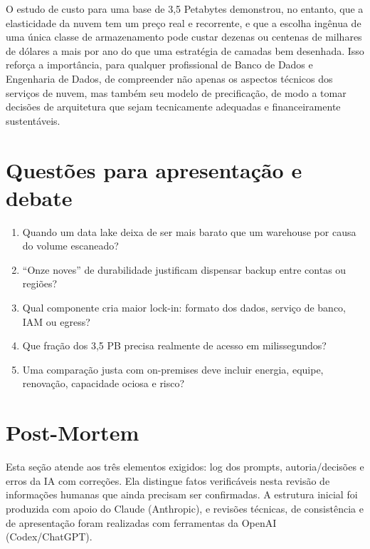 \documentclass[11pt,a4paper]{article}
\begin{document}
O estudo de custo para uma base de 3,5 Petabytes demonstrou, no entanto, que a elasticidade da nuvem tem um preço real e recorrente, e que a escolha ingênua de uma única classe de armazenamento pode custar dezenas ou centenas de milhares de dólares a mais por ano do que uma estratégia de camadas bem desenhada. Isso reforça a importância, para qualquer profissional de Banco de Dados e Engenharia de Dados, de compreender não apenas os aspectos técnicos dos serviços de nuvem, mas também seu modelo de precificação, de modo a tomar decisões de arquitetura que sejam tecnicamente adequadas e financeiramente sustentáveis.

\section{Questões para apresentação e debate}
\begin{enumerate}
\item Quando um data lake deixa de ser mais barato que um warehouse por causa do volume escaneado?
\item ``Onze noves'' de durabilidade justificam dispensar backup entre contas ou regiões?
\item Qual componente cria maior lock-in: formato dos dados, serviço de banco, IAM ou egress?
\item Que fração dos 3,5 PB precisa realmente de acesso em milissegundos?
\item Uma comparação justa com on-premises deve incluir energia, equipe, renovação, capacidade ociosa e risco?
\end{enumerate}

\clearpage
\section{Post-Mortem}\label{sec:postmortem}
Esta seção atende aos três elementos exigidos: log dos prompts, autoria/decisões e erros da IA com
correções. Ela distingue fatos verificáveis nesta revisão de informações humanas que ainda precisam
ser confirmadas. A estrutura inicial foi produzida com apoio do Claude (Anthropic), e revisões técnicas,
de consistência e de apresentação foram realizadas com ferramentas da OpenAI (Codex/ChatGPT).
\end{document}
